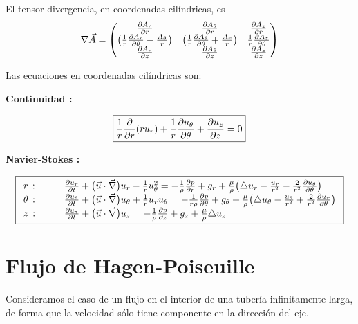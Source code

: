	El tensor divergencia, en coordenadas cilíndricas, es
	\[
	\nabla\vec{A}=\begin{pmatrix}\frac{\partial A_{r}}{\partial r} & \frac{\partial A_{\theta}}{\partial r} & \frac{\partial A_{z}}{\partial r}\\
		\left(\frac{1}{r}\frac{\partial A_{r}}{\partial \theta}-\frac{A_{\theta}}{r}\right) & \left(\frac{1}{r}\frac{\partial A_{\theta}}{\partial \theta}+\frac{A_{r}}{r}\right) & \frac{1}{r}\frac{\partial A_{z}}{\partial \theta}\\
		\frac{\partial A_{r}}{\partial z} & \frac{\partial A_{\theta}}{\partial z} & \frac{\partial A_{z}}{\partial z}
	\end{pmatrix}
	\]
	
	
	Las ecuaciones en coordenadas cilíndricas son:
	
	\textbf{Continuidad :} 
	
\begin{equation}
		\boxed{\frac{1}{r}\frac{\partial }{\partial r}(ru_{r})+\frac{1}{r}\frac{\partial u_{\theta}}{\partial \theta}+\frac{\partial u_{z}}{\partial z}=0}
\end{equation}
	
	
	\textbf{Navier-Stokes :} {\small{}
		
		\begin{equation}
			\boxed{\begin{array}{ll}
				r\,: & \qquad\frac{\partial u_{r}}{\partial t}+\bigl(\vec{u}\cdot\vec{\nabla}\bigr)u_{r}-\frac{1}{r}u_{\theta}^{2}=-\frac{1}{\rho}\frac{\partial p}{\partial r}+g_{r}+\frac{\mu}{\rho}\bigl(\triangle u_{r}-\frac{u_{r}}{r^{2}}-\frac{2}{r^{2}}\frac{\partial u_{\theta}}{\partial \theta}\bigr)\\
				\theta\,: & \qquad\frac{\partial u_{\theta}}{\partial t}+\bigl(\vec{u}\cdot\vec{\nabla}\bigr)u_{\theta}+\frac{1}{r}u_{r}u_{\theta}=-\frac{1}{r\rho}\frac{\partial p}{\partial \theta}+g_{\theta}+\frac{\mu}{\rho}\bigl(\triangle u_{\theta}-\frac{u_{\theta}}{r^{2}}+\frac{2}{r^{2}}\frac{\partial u_{r}}{\partial \theta}\bigr)\\
				z\,: & \qquad\frac{\partial u_{z}}{\partial t}+\bigl(\vec{u}\cdot\vec{\nabla}\bigr)u_{z}=-\frac{1}{\rho}\frac{\partial p}{\partial z}+g_{z}+\frac{\mu}{\rho}\triangle u_{z}
		\end{array}}
		\end{equation}
		
	} 

\section{Flujo de Hagen-Poiseuille}
	
	Consideramos el caso de un flujo en el interior de una tubería infinitamente
	larga, de forma que la velocidad sólo tiene componente en la dirección
	del eje.
	
